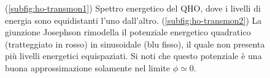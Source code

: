 \begin{figure}[H]
	\centering	
	 \qquad \qquad
	\caption{(\ref{subfig:ho-transmon1}) Spettro energetico del QHO, dove i livelli di energia sono equidistanti l'uno dall'altro. (\ref{subfig:ho-transmon2}) La giunzione Josephson rimodella il potenziale energetico quadratico (tratteggiato in rosso) in sinusoidale (blu fisso), il quale non presenta più livelli energetici equispaziati. Si noti che questo potenziale è una buona approssimazione solamente nel limite $\phi \simeq 0$.}
	\label{fig:ho-transmon}
\end{figure}

